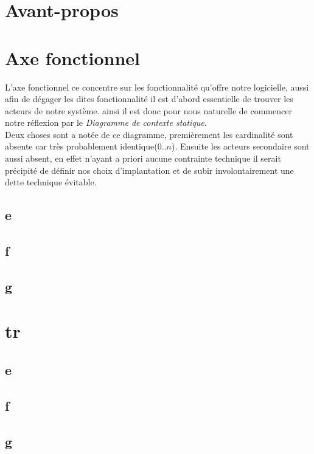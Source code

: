 \documentclass[a4paper,french,final]{memoir}
\begin{document}
\begin{titlingpage}
\hypersetup{pageanchor=false}

\end{titlingpage}
\frontmatter
\tableofcontents
\chapter{Avant-propos}
\mainmatter
\let\savedthechapter\thechapter%
\renewcommand{\thechapter}{I}
\chapter{Axe fonctionnel}
\begin{center}

\end{center}
L'axe fonctionnel ce concentre sur les fonctionnalité qu'offre notre logicielle, aussi afin de dégager les dites fonctionnalité il est d'abord essentielle de trouver les acteurs de notre système. ainsi il est donc pour nous naturelle de commencer notre réflexion par le \emph{Diagramme de contexte statique}.\\
Deux choses sont a notée de ce diagramme, premièrement les cardinalité sont absente car très probablement identique($0..n$). Ensuite les acteurs secondaire sont aussi absent, en effet n'ayant a priori aucune contrainte technique il serait précipité de définir nos choix d'implantation et de subir involontairement une dette technique évitable.
\let\thechapter\savedthechapter%
\section{e}
\section{f}
\section{g}
\chapter{}
\appendixpage
\appendix

\chapter{tr}
\section{e}
\section{f}
\section{g}
\backmatter
\end{document}
